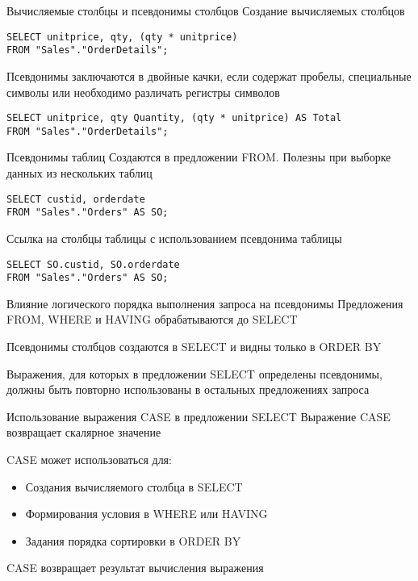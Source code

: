 \documentclass[12pt]{article}
\begin{document}
\begin{Example}{Вычисляемые столбцы и псевдонимы столбцов}
    Создание вычисляемых столбцов 
    \begin{lstlisting}
SELECT unitprice, qty, (qty * unitprice) 
FROM "Sales"."OrderDetails";
    \end{lstlisting}

    Псевдонимы заключаются в двойные качки, если содержат пробелы, специальные символы или необходимо различать регистры символов
    \begin{lstlisting}
SELECT unitprice, qty Quantity, (qty * unitprice) AS Total 
FROM "Sales"."OrderDetails";
    \end{lstlisting}
\end{Example}

\begin{Example}{Псевдонимы таблиц}
    Создаются в предложении FROM. Полезны при выборке данных из нескольких таблиц 
    \begin{lstlisting}
SELECT custid, orderdate 
FROM "Sales"."Orders" AS SO;
    \end{lstlisting}

    Ссылка на столбцы таблицы с использованием псевдонима таблицы 
    \begin{lstlisting}
SELECT SO.custid, SO.orderdate
FROM "Sales"."Orders" AS SO;
    \end{lstlisting}
\end{Example}

\begin{nota}{Влияние логического порядка выполнения запроса на псевдонимы}
    Предложения FROM, WHERE и HAVING обрабатываются до SELECT 

    Псевдонимы столбцов создаются в SELECT и видны только в ORDER BY 

    Выражения, для которых в предложении SELECT определены псевдонимы, должны быть повторно использованы в остальных предложениях запроса
\end{nota}

\begin{nota}{Использование выражения CASE в предложении SELECT}
    Выражение CASE возвращает скалярное значение 

    CASE может использоваться для:

    \begin{itemize}
        \item Создания вычисляемого столбца в SELECT 
        \item Формирования условия в WHERE или HAVING
        \item Задания порядка сортировки в ORDER BY
    \end{itemize}

    CASE возвращает результат вычисления выражения
\end{nota}
\end{document}
